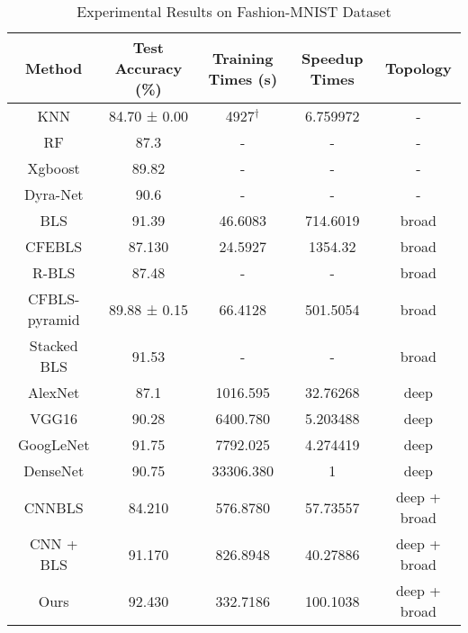 \documentclass[lettersize,journal]{IEEEtran}
\begin{document}
\begin{table*}[!t]
\caption{Experimental Results on Fashion-MNIST Dataset\label{tab:fashion_mnist}}
\centering
\begin{tabular}{c c c c c}
\hline\hline
Method & Test Accuracy (\%) & Training Times (s) & Speedup Times & Topology\\
\hline
KNN \cite{zhang2020analysis} & 84.70 ± 0.00 & 4927$^\dag$ & 6.759972 & - \\
RF \cite{liu2020stacked} & 87.3 & - & - & - \\
Xgboost \cite{liu2020stacked} & 89.82 & - & - & - \\
Dyra-Net \cite{liu2020stacked} & 90.6 & - & - & - \\
\hline
BLS \cite{chen2017broad} & 91.39 & 46.6083 & 714.6019 & broad \\
CFEBLS \cite{chen2018universal} & 87.130 & 24.5927 & 1354.32 & broad \\
R-BLS \cite{zhang2018rich} & 87.48 & - & - & broad \\
CFBLS-pyramid \cite{zhang2020analysis} & 89.88 ± 0.15 & 66.4128 & 501.5054 & broad \\
Stacked BLS \cite{liu2020stacked}
& 91.53 & - & - & broad \\
\hline
AlexNet \cite{krizhevsky2012imagenet} & 87.1 & 1016.595 & 32.76268 & deep \\
VGG16 \cite{simonyan2014very} & 90.28 & 6400.780 & 5.203488 & deep \\
GoogLeNet \cite{szegedy2015going} & 91.75 & 7792.025 & 4.274419 & deep \\
DenseNet \cite{huang2017densely} & 90.75 & 33306.380 & 1 & deep \\
\hline
CNNBLS \cite{yang2018cnn} & 84.210 & 576.8780 & 57.73557 & deep + broad \\
CNN + BLS \cite{li2019cnn} & 91.170 & 826.8948 & 40.27886 & deep + broad \\
Ours & 92.430 & 332.7186 & 100.1038 & deep + broad \\
\hline\hline
\end{tabular}
\end{table*}
\end{document}
